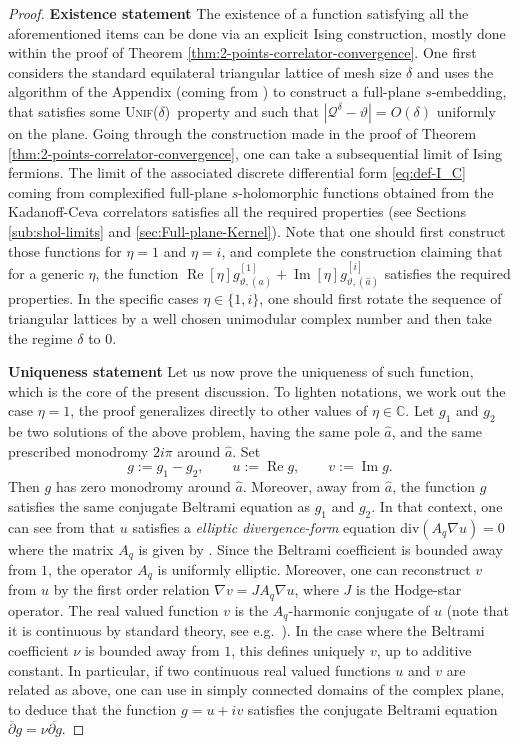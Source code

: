 \documentclass[reqno]{amsart}
\numberwithin{equation}{section}
\theoremstyle{definition}
\theoremstyle{remark}
\renewcommand\Re{\operatorname{Re}}
\renewcommand\Im{\operatorname{Im}}
\newcommand\cQ{\mathcal{Q}}
\newcommand\Unif{{\mbox{\textsc{Unif(}$\delta$\textsc{)}}}}
\begin{document}
\begin{proof}
\textbf{Existence statement} The existence of a function satisfying all the aforementioned items can be done via an explicit Ising construction, mostly done within the proof of Theorem \ref{thm:2-points-correlator-convergence}. One first considers the standard equilateral triangular lattice of mesh size $\delta$ and uses the algorithm of the Appendix (coming from \cite[Remark 1.3]{Par25}) to construct a full-plane $s$-embedding, that satisfies some \Unif\ property and such that $|\cQ^\delta - \vartheta|=O(\delta)$ uniformly on the plane. Going through the construction made in the proof of Theorem \ref{thm:2-points-correlator-convergence}, one can take a subsequential limit of Ising fermions. The limit of the associated discrete differential form \eqref{eq:def-I_C} coming from complexified full-plane $s$-holomorphic functions obtained from the Kadanoff-Ceva correlators satisfies all the required properties (see Sections \ref{sub:shol-limits} and \ref{sec:Full-plane-Kernel}). Note that one should first construct those functions for $\eta=1$ and $\eta=i$, and complete the construction claiming that for a generic $\eta $, the function $\Re[\eta] g^{[1]}_{\vartheta,(\hat{a})} + \Im[\eta]g^{[i]}_{\vartheta,(\hat{a})} $ satisfies the required properties. In the specific cases $\eta \in \{1,i\}$, one should first rotate the sequence of triangular lattices by a well chosen unimodular complex number and then take the regime $\delta $ to $0$.

	
\textbf{Uniqueness statement} Let us now prove the uniqueness of such function, which is the core of the present discussion. To lighten notations, we work out the case $\eta = 1$, the proof generalizes directly to other values of $\eta \in \mathbb{C}$. Let $g_1$ and $g_2$ be two solutions of the above problem, having 
the same pole $\hat{a}$, and the same prescribed monodromy  $2i\pi $ around $\hat{a}$. Set
\[
    g:=g_1-g_2,\qquad u:=\operatorname{Re}g,\qquad v:=\operatorname{Im}g .
\]
Then $g$ has zero monodromy around $\hat{a}$. Moreover, away from $\hat{a}$, the function $g$ satisfies the same conjugate Beltrami equation as $g_1$ and $g_2$.  In that context, one can see from \cite[Chapter 16]{AIM} that $u$ satisfies a \emph{elliptic divergence-form} equation $\text{div}( A_{q} \nabla u)=0 $ where the matrix $A_{q}$ is given by \cite[Theorem 16.1.6, (16.20)]{AIM}. Since the Beltrami coefficient is bounded away from $1$, the operator $A_{q}$ is uniformly elliptic. Moreover, one can reconstruct $v$ from $u$ by the first order relation $\nabla v = JA_{q}\nabla u$, where $J$ is the Hodge-star operator. The real valued function $v$ is the $A_{q}$-harmonic conjugate of $u$ (note that it is continuous by standard theory, see e.g.\ \cite{kenig2000new}).  In the case where the Beltrami coefficient $\nu$ is bounded away from $1$, this defines uniquely $v$, up to additive constant. In particular, if two continuous real valued functions $u$ and $v$ are related as above, one can use \cite[Theorem 16.1.6]{AIM} in simply connected domains of the complex plane, to deduce that the function $g=u+iv$ satisfies the conjugate Beltrami equation $\overline{\partial} g = \nu \overline{\partial g}$. 


\end{proof}
\end{document}
